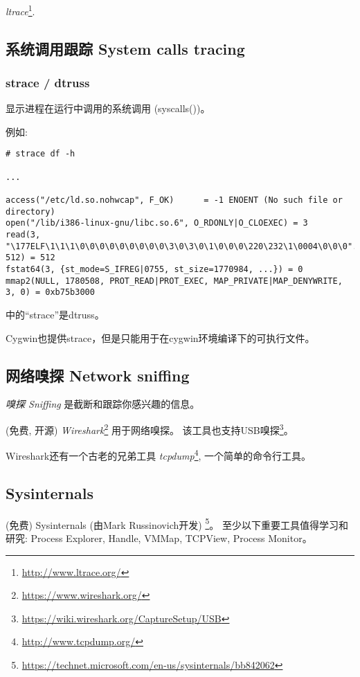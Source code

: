 \documentclass[UTF8,nofonts]{ctexart}
\begin{document}
\emph{ltrace}\footnote{\url{http://www.ltrace.org/}}.

\subsection{系统调用跟踪 System calls tracing}

\label{strace}
\subsubsection{strace / dtruss}

显示进程在运行中调用的系统调用 (syscalls())。

例如:

\begin{lstlisting}
# strace df -h

...

access("/etc/ld.so.nohwcap", F_OK)      = -1 ENOENT (No such file or directory)
open("/lib/i386-linux-gnu/libc.so.6", O_RDONLY|O_CLOEXEC) = 3
read(3, "\177ELF\1\1\1\0\0\0\0\0\0\0\0\0\3\0\3\0\1\0\0\0\220\232\1\0004\0\0\0"..., 512) = 512
fstat64(3, {st_mode=S_IFREG|0755, st_size=1770984, ...}) = 0
mmap2(NULL, 1780508, PROT_READ|PROT_EXEC, MAP_PRIVATE|MAP_DENYWRITE, 3, 0) = 0xb75b3000
\end{lstlisting}

\myindex{\MacOSX}
\MacOSX 中的``strace''是dtruss。

Cygwin也提供strace，但是只能用于在cygwin环境编译下的可执行文件。

\subsection{网络嗅探 Network sniffing}

\emph{嗅探 Sniffing} 是截断和跟踪你感兴趣的信息。

(免费, 开源) \emph{Wireshark}\footnote{\url{https://www.wireshark.org/}} 用于网络嗅探。
该工具也支持USB嗅探\footnote{\url{https://wiki.wireshark.org/CaptureSetup/USB}}。

Wireshark还有一个古老的兄弟工具 \emph{tcpdump}\footnote{\url{http://www.tcpdump.org/}}, 一个简单的命令行工具。

\subsection{Sysinternals}

(免费) Sysinternals (由Mark Russinovich开发)
\footnote{\url{https://technet.microsoft.com/en-us/sysinternals/bb842062}}。
至少以下重要工具值得学习和研究: Process Explorer, Handle, VMMap, TCPView, Process Monitor。
\end{document}
